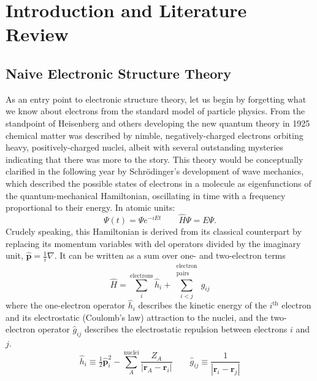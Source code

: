 \chapter[%
    Introduction and Literature Review
]{%
    Introduction and Literature Review
}

\section{Naive Electronic Structure Theory}

As an entry point to electronic structure theory, let us begin by forgetting
what we know about electrons from the standard model of particle physics.
From the standpoint of Heisenberg and others developing the new quantum theory
in 1925\cite{Heisenberg:1925p879} chemical matter was described by nimble,
negatively-charged electrons orbiting heavy, positively-charged nuclei, albeit
with several outstanding mysteries indicating that there was more to the story.
This theory would be conceptually clarified in the following year by
Schr\"odinger's development of wave mechanics,
\cite{Schrodinger:1926p361,Schrodinger:1926p489,Schrodinger:1926p734}
which described the possible states of electrons in a molecule as eigenfunctions
of the quantum-mechanical Hamiltonian, oscillating in time with a frequency
proportional to their energy.
In atomic units:
\begin{equation}
    \Psi(t)
    =
    \Psi
    e^{-iEt}
    \qquad
    \hat{H}
    \Psi
    =
    E
    \Psi.
\end{equation}
Crudely speaking, this Hamiltonian is derived from its classical counterpart by
replacing its momentum variables with del operators divided by the imaginary
unit,
\(
    \hat{\mathbf{p}}
    =
    \frac{1}{i}
    \nabla
\).
It can be written as a sum over one- and two-electron terms
\begin{equation}
    \hat{H}
    =
    \sum_i^\text{electrons}
    \hat{h}_i
    +
    \sum_{i<j}^{\substack{\text{electron}\\\text{pairs}}}
    \hat{g}_{ij}
\end{equation}
where the one-electron operator
\(
    \hat{h}_i
\)
describes the kinetic energy of the \(i^\text{th}\) electron and its
electrostatic (Coulomb's law) attraction to the nuclei, and the two-electron
operator
\(
    \hat{g}_{ij}
\)
describes the electrostatic repulsion between electrons \(i\) and \(j\).
\begin{equation}
    \hat{h}_i
    \equiv
    \tfrac{1}{2}
    \hat{\mathbf{p}}_i^2
    -
    \sum_A^\text{nuclei}
    \frac{Z_A}{|\mathbf{r}_A - \mathbf{r}_i|}
    \qquad
    \hat{g}_{ij}
    \equiv
    \frac{1}{|\mathbf{r}_i - \mathbf{r}_j|}
\end{equation}
